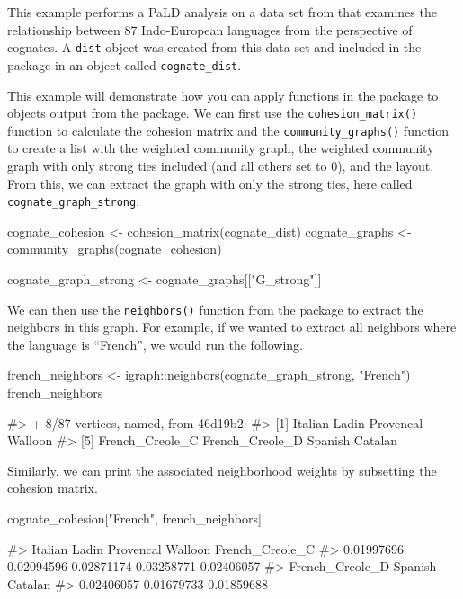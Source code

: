This example performs a PaLD analysis on a data set from \citet{dyen92}
that examines the relationship between 87 Indo-European languages from
the perspective of cognates. A \texttt{dist} object was created from
this data set and included in the  package in an object
called \texttt{cognate\_dist}.

This example will demonstrate how you can apply functions in the
 package to objects output from the 
package. We can first use the \texttt{cohesion\_matrix()} function to
calculate the cohesion matrix and the \texttt{community\_graphs()}
function to create a list with the weighted community graph, the
weighted community graph with only strong ties included (and all others
set to 0), and the layout. From this, we can extract the graph with only
the strong ties, here called \texttt{cognate\_graph\_strong}.

\begin{Schunk}
\begin{Sinput}
cognate_cohesion <- cohesion_matrix(cognate_dist)
cognate_graphs <- community_graphs(cognate_cohesion)

cognate_graph_strong <- cognate_graphs[["G_strong"]]
\end{Sinput}
\end{Schunk}

We can then use the \texttt{neighbors()} function from the
 package to extract the neighbors in this graph. For
example, if we wanted to extract all neighbors where the language is
``French'', we would run the following.

\begin{Schunk}
\begin{Sinput}
french_neighbors <- igraph::neighbors(cognate_graph_strong, "French")
french_neighbors
\end{Sinput}
\begin{Soutput}
#> + 8/87 vertices, named, from 46d19b2:
#> [1] Italian         Ladin           Provencal       Walloon        
#> [5] French_Creole_C French_Creole_D Spanish         Catalan
\end{Soutput}
\end{Schunk}

Similarly, we can print the associated neighborhood weights by
subsetting the cohesion matrix.

\begin{Schunk}
\begin{Sinput}
cognate_cohesion["French", french_neighbors]
\end{Sinput}
\begin{Soutput}
#>         Italian           Ladin       Provencal         Walloon French_Creole_C 
#>      0.01997696      0.02094596      0.02871174      0.03258771      0.02406057 
#> French_Creole_D         Spanish         Catalan 
#>      0.02406057      0.01679733      0.01859688
\end{Soutput}
\end{Schunk}


